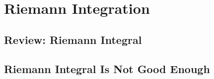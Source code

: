 \chapter{Riemann Integration}

\section{Review: Riemann Integral}

\section{Riemann Integral Is Not Good Enough}
